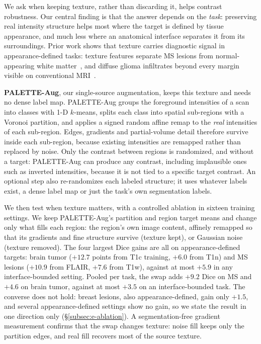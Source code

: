 We ask when keeping texture, rather than discarding it, helps contrast
robustness. Our central finding is that
the answer depends on the \emph{task}: preserving real intensity structure
helps most where the target is defined by tissue appearance, and much less
where an anatomical interface separates it from its surroundings. Prior work shows that texture carries diagnostic signal in appearance-defined
tasks: texture features separate MS lesions from normal-appearing white
matter~\cite{zhang2008mstexture}, and diffuse glioma infiltrates beyond every
margin visible on conventional MRI~\cite{gliomamargins2025,flairectomy2022}.

\textbf{PALETTE-Aug}, our single-source augmentation, keeps this texture and
needs no dense label map. PALETTE-Aug groups the foreground intensities of a
scan into classes with 1-D $k$-means, splits each class into spatial
sub-regions with a Voronoi partition, and applies a signed random affine remap
to the \emph{real} intensities of each sub-region. Edges, gradients and partial-volume detail therefore survive inside each
sub-region, because existing intensities are remapped rather than replaced by
noise. Only the contrast between regions is randomized, and without a
target: PALETTE-Aug can produce any contrast, including implausible ones such
as inverted intensities, because it is not tied to a specific target contrast.
An optional step also re-randomizes each labeled structure; it uses whatever
labels exist, a dense label map or just the task's own segmentation labels.

We then test when texture matters, with a controlled ablation in sixteen
training settings. We keep PALETTE-Aug's partition and region target means and
change only what fills each region: the region's own image content, affinely
remapped so that its gradients and fine structure survive (texture kept), or
Gaussian noise (texture removed). The four largest Dice gains are all on
appearance-defined targets: brain tumor ($+12.7$ points from T1c training,
$+6.0$ from T1n) and MS lesions ($+10.9$ from FLAIR, $+7.6$ from T1w), against
at most $+5.9$ in any interface-bounded setting. Pooled per task, the swap adds
$+9.2$ Dice on MS and $+4.6$ on brain tumor, against at most $+3.5$ on an
interface-bounded task. The converse does not hold: breast lesions, also
appearance-defined, gain only $+1.5$, and several appearance-defined settings
show no gain, so we state the result in one direction only
(\S\ref{subsec:e-ablation}). A
segmentation-free gradient measurement confirms that the swap changes texture:
noise fill keeps only the partition edges, and real fill recovers most of the
source texture.


